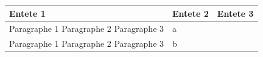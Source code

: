 \documentclass[11pt,a4paper]{article}
\begin{document}
\begin{table}[h]
\begin{tabular}{|l|l|l|}
\hline
Entete 1 & Entete 2 & Entete 3 \\ \hline
Paragraphe 1  Paragraphe 2  Paragraphe 3 & a &  \\ \hline
Paragraphe 1  Paragraphe 2  Paragraphe 3 & b &  \\ \hline
\end{tabular}
\end{table}
\end{document}
